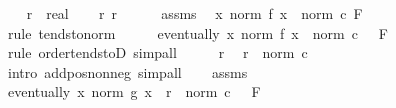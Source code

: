 \begin{isabellebody}
\ \ \isamarkupfalse%
\ r\ {\isacharcolon}{\kern0pt}{\isacharcolon}{\kern0pt}\ real\isanewline
\ \ \isamarkupfalse%
\ r{\isacharcolon}{\kern0pt}\ {\isachardoublequoteopen}r\ {\isachargreater}{\kern0pt}\ {}{\isachardoublequoteclose}\isanewline
\ \ \isamarkupfalse%
\ assms{\isacharparenleft}{\kern0pt}{}{\isacharparenright}{\kern0pt}\ \isamarkupfalse%
\ {\isachardoublequoteopen}{\isacharparenleft}{\kern0pt}{\isacharparenleft}{\kern0pt}{\isasymlambda}x{\isachardot}{\kern0pt}\ norm\ {\isacharparenleft}{\kern0pt}f\ x{\isacharparenright}{\kern0pt}{\isacharparenright}{\kern0pt}\ {\isasymlonglongrightarrow}\ norm\ c{\isacharparenright}{\kern0pt}\ F{\isachardoublequoteclose}\isanewline
\ \ \ \ \isamarkupfalse%
\ {\isacharparenleft}{\kern0pt}rule\ tendsto{\isacharunderscore}{\kern0pt}norm{\isacharparenright}{\kern0pt}\isanewline
\ \ \isamarkupfalse%
\ \isamarkupfalse%
\ {\isachardoublequoteopen}eventually\ {\isacharparenleft}{\kern0pt}{\isasymlambda}x{\isachardot}{\kern0pt}\ norm\ {\isacharparenleft}{\kern0pt}f\ x{\isacharparenright}{\kern0pt}\ {\isacharless}{\kern0pt}\ norm\ c\ {\isacharplus}{\kern0pt}\ {}{\isacharparenright}{\kern0pt}\ F{\isachardoublequoteclose}\isanewline
\ \ \ \ \isamarkupfalse%
\ {\isacharparenleft}{\kern0pt}rule\ order{\isacharunderscore}{\kern0pt}tendstoD{\isacharparenright}{\kern0pt}\ simp{\isacharunderscore}{\kern0pt}all\isanewline
\ \ \isamarkupfalse%
\ \isamarkupfalse%
\ r\ \isamarkupfalse%
\ {\isachardoublequoteopen}r\ {\isacharplus}{\kern0pt}\ norm\ c\ {\isacharplus}{\kern0pt}\ {}\ {\isachargreater}{\kern0pt}\ {}{\isachardoublequoteclose}\isanewline
\ \ \ \ \isamarkupfalse%
\ {\isacharparenleft}{\kern0pt}intro\ add{\isacharunderscore}{\kern0pt}pos{\isacharunderscore}{\kern0pt}nonneg{\isacharparenright}{\kern0pt}\ simp{\isacharunderscore}{\kern0pt}all\isanewline
\ \ \isamarkupfalse%
\ assms{\isacharparenleft}{\kern0pt}{}{\isacharparenright}{\kern0pt}\ \isamarkupfalse%
\ {\isachardoublequoteopen}eventually\ {\isacharparenleft}{\kern0pt}{\isasymlambda}x{\isachardot}{\kern0pt}\ norm\ {\isacharparenleft}{\kern0pt}g\ x{\isacharparenright}{\kern0pt}\ {\isasymge}\ r\ {\isacharplus}{\kern0pt}\ norm\ c\ {\isacharplus}{\kern0pt}\ {}{\isacharparenright}{\kern0pt}\ F{\isachardoublequoteclose}\isanewline
\ \ \ \ \isamarkupfalse%

\end{isabellebody}
